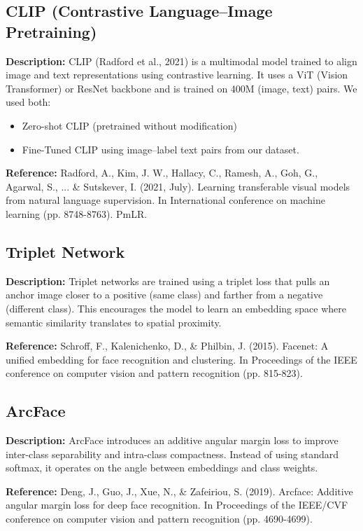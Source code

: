 \documentclass[10pt,twocolumn,letterpaper]{article}
\begin{document}
\subsection{CLIP (Contrastive Language--Image Pretraining)}
\textbf{Description:} CLIP (Radford et al., 2021) is a multimodal model trained to align image and text representations using contrastive learning. It uses a ViT (Vision Transformer) or ResNet backbone and is trained on 400M (image, text) pairs. We used both:
\begin{itemize}
  \item Zero-shot CLIP (pretrained without modification)
  \item Fine-Tuned CLIP using image--label text pairs from our dataset.
\end{itemize}
\textbf{Reference:} Radford, A., Kim, J. W., Hallacy, C., Ramesh, A., Goh, G., Agarwal, S., ... \& Sutskever, I. (2021, July). Learning transferable visual models from natural language supervision. In International conference on machine learning (pp. 8748-8763). PmLR.

\subsection{Triplet Network}
\textbf{Description:} Triplet networks are trained using a triplet loss that pulls an anchor image closer to a positive (same class) and farther from a negative (different class). This encourages the model to learn an embedding space where semantic similarity translates to spatial proximity.

\textbf{Reference:} Schroff, F., Kalenichenko, D., \& Philbin, J. (2015). Facenet: A unified embedding for face recognition and clustering. In Proceedings of the IEEE conference on computer vision and pattern recognition (pp. 815-823).

\subsection{ArcFace}
\textbf{Description:} ArcFace introduces an additive angular margin loss to improve inter-class separability and intra-class compactness. Instead of using standard softmax, it operates on the angle between embeddings and class weights.

\textbf{Reference:} Deng, J., Guo, J., Xue, N., \& Zafeiriou, S. (2019). Arcface: Additive angular margin loss for deep face recognition. In Proceedings of the IEEE/CVF conference on computer vision and pattern recognition (pp. 4690-4699).
\end{document}
